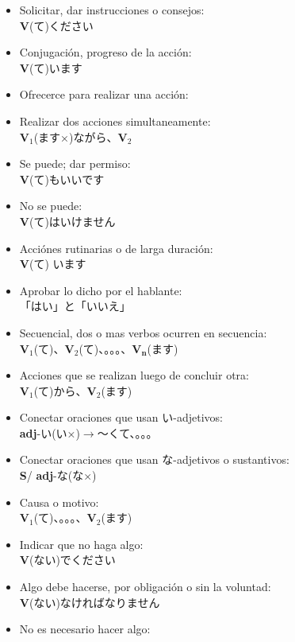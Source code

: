 \documentclass[a4paper,12pt,oneside]{report}
\def\to{$\longrightarrow$}
\def\bv{\textbf{V}} %
\def\bs{\textbf{S}} %
\def\adj{\textbf{adj}} %
\def\vi{$\mathrm{\bv}_1$} %
\def\vn{$\mathrm{\bv}_2$} %
\def\vene{$\mathrm{\bv}_\mathrm{\textbf{n}}$} %
\def\tenten{。。。}
\begin{document}
\begin{CJK*}{UTF8}{min}
  \begin{itemize}
    \item Solicitar, dar instrucciones o consejos:\\
          \bv(て)ください
    \item Conjugaci\'on, progreso de la acci\'on:\\
          \bv(て)います
    \item Ofrecerce para realizar una acci\'on:\\
    \item Realizar dos acciones simultaneamente:\\
          \vi(ます×)ながら、\vn
    \item Se puede; dar permiso:\\
          \bv(て)もいいです
    \item No se puede:\\
          \bv(て)はいけません
    \item Acci\'ones rutinarias o de larga duraci\'on:\\
          \bv(て) います
    \item Aprobar lo dicho por el hablante:\\
          「はい」と「いいえ」
    \item Secuencial, dos o mas verbos ocurren en secuencia:\\
          \vi(て)、\vn(て)、\tenten、\vene(ます)
    \item Acciones que se realizan luego de concluir otra:\\
          \vi(て)から、\vn(ます)
    \item Conectar oraciones que usan い-adjetivos:\\
          \adj-い(い×)\to〜くて、\tenten
    \item Conectar oraciones que usan な-adjetivos o sustantivos:\\
          \bs / \adj-な(な×)
    \item Causa o motivo:\\
          \vi(て)、\tenten、\vn(ます)
    \item Indicar que no haga algo:\\
          \bv(ない)でください
    \item Algo debe hacerse, por obligación o sin la voluntad:\\
          \bv(ない)なければなりません
    \item No es necesario hacer algo:\\

\end{itemize}
\end{CJK*}
\end{document}
